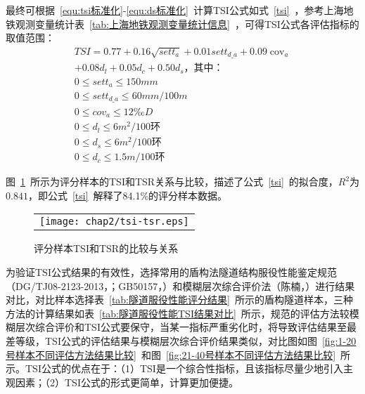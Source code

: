最终可根据~\ref{equ:tsi标准化}-\ref{equ:ds标准化}~计算TSI公式如式~\ref{tsi}~，参考上海地铁观测变量统计表~\ref{tab:上海地铁观测变量统计信息}~，可得TSI公式各评估指标的取值范围：
\begin{gather}
  \label{tsi}
  TSI=0.77+0.16\sqrt{set{{t}_{a}}}+0.01set{{t}_{d\_a}}+0.09{{\operatorname{cov}}_{a}} \\ 
  +0.08{{d}_{l}}+0.05{{d}_{c}}+0.50{{d}_{s}}\text{，其中：}  \nonumber \\
  0\le set{{t}_{a}}\le 150mm \nonumber \\
  0\le set{{t}_{d\_a}}\le 60mm/100m \nonumber \\
  0\le cov_a\le 12‰D \nonumber \\
  0\le d_l\le 6m^2/100\text{环} \nonumber \\
  0\le d_s\le 6m^2/100\text{环} \nonumber \\
  0\le d_c\le 1.5m/100\text{环} \nonumber
\end{gather}

图~\ref{fig:TSI和TSR的比较与关系}~所示为评分样本的TSI和TSR关系与比较，描述了公式~\ref{tsi}~的拟合度，$R^2$为$0.841$，即公式~\ref{tsi}~解释了84.1\%的评分样本数据。

\begin{figure}[htb!] 
    \centering 
    \begin{tabular}{c} 
        \texttt{[image: chap2/tsi-tsr.eps]} \\ 
    \end{tabular}
    \caption{评分样本TSI和TSR的比较与关系} 
    \label{fig:TSI和TSR的比较与关系} 
\end{figure}

为验证TSI公式结果的有效性，选择常用的盾构法隧道结构服役性能鉴定规范（DG/TJ08-2123-2013，\citeyear{DGTJ0821232013}；GB50157，\citeyear{GB501572013}）和模糊层次综合评价法（陈楠，\citeyear{陈楠2017考虑发展趋势与指标关联的隧道结构健康评估方法研究}）进行结果对比，对比样本选择表~\ref{tab:隧道服役性能评分结果}~所示的盾构隧道样本，三种方法的计算结果如表~\ref{tab:隧道服役性能TSI结果对比}~所示，规范的评估方法较模糊层次综合评价和TSI公式要保守，当某一指标严重劣化时，将导致评估结果至最差等级，TSI公式的评估结果与模糊层次综合评价结果类似，对比图如图~\ref{fig:1-20号样本不同评估方法结果比较}~和图~\ref{fig:21-40号样本不同评估方法结果比较}~所示。TSI公式的优点在于：（1）TSI是一个综合性指标，且该指标尽量少地引入主观因素；（2）TSI公式的形式更简单，计算更加便捷。

